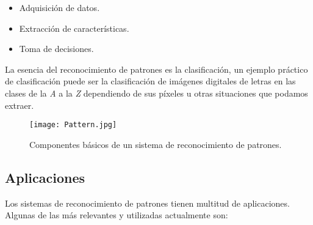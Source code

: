 \begin{itemize}
 \item Adquisición de datos.
 \item Extracción de características.
 \item Toma de decisiones.
\end{itemize}

La esencia del reconocimiento de patrones es la clasificación, un ejemplo práctico de clasificación puede ser la clasificación de imágenes digitales de letras en las clases de la \emph{A} a la \emph{Z} dependiendo de sus píxeles u otras situaciones que podamos extraer.\\

\begin{figure}[H]
  \begin{center}
    \texttt{[image: Pattern.jpg]}
  \end{center}
  \caption{Componentes básicos de un sistema de reconocimiento de patrones.}
  \label{Componentes-basicos-rp}
\end{figure}


\subsection {Aplicaciones}

Los sistemas de reconocimiento de patrones tienen multitud de aplicaciones. Algunas de las más relevantes y utilizadas actualmente son:\\

